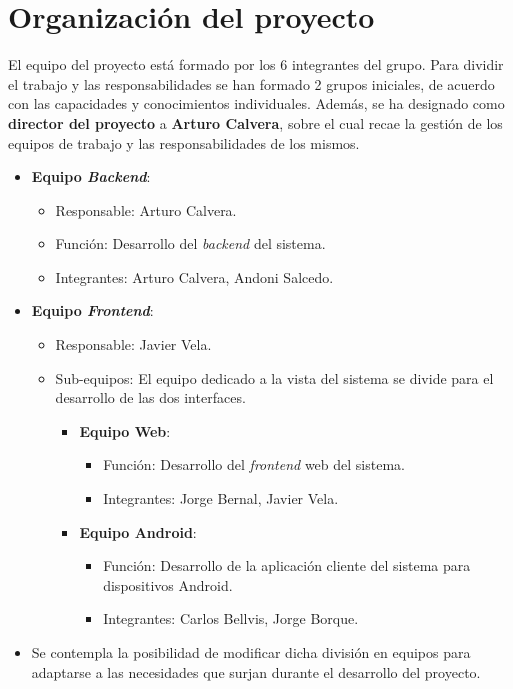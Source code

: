 \documentclass{article}
\begin{document}
\section{Organización del proyecto}

El equipo del proyecto está formado por los 6 integrantes del grupo. 
Para dividir el trabajo y las responsabilidades se han formado 2 grupos iniciales, 
de acuerdo con las capacidades y conocimientos individuales. 
Además, se ha designado como \textbf{director del proyecto} a \textbf{Arturo Calvera}, 
sobre el cual recae la gestión de los equipos de trabajo y las responsabilidades de los mismos.

\begin{itemize}
    \item \textbf{Equipo \textit{Backend}}:
    \begin{itemize}
        \item Responsable: Arturo Calvera.
        \item Función: Desarrollo del \textit{backend} del sistema.
        \item Integrantes: Arturo Calvera, Andoni Salcedo.
    \end{itemize}
    \item \textbf{Equipo \textit{Frontend}}:
    \begin{itemize}
        \item Responsable: Javier Vela.
        \item Sub-equipos: El equipo dedicado a la vista del sistema se divide para el desarrollo de las dos interfaces.
        \begin{itemize}
            \item \textbf{Equipo Web}:
            \begin{itemize}
                \item Función: Desarrollo del \textit{frontend} web del sistema.
                \item Integrantes: Jorge Bernal, Javier Vela.
            \end{itemize}
        \item \textbf{Equipo Android}:
            \begin{itemize}
                \item Función: Desarrollo de la aplicación cliente del sistema para dispositivos Android.
                \item Integrantes: Carlos Bellvis, Jorge Borque.
            \end{itemize}
        \end{itemize}
    \end{itemize}
    \item Se contempla la posibilidad de modificar dicha división en equipos para adaptarse a las necesidades que surjan durante el desarrollo del proyecto.
\end{itemize}
\end{document}
